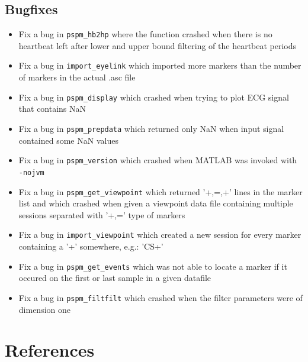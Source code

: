 \documentclass[english]{article}
\numberwithin{equation}{section}
\numberwithin{figure}{section}
\begin{document}
\subsection*{Bugfixes}
\begin{itemize}
\item Fix a bug in \texttt{pspm\_hb2hp} where the function crashed when
there is no heartbeat left after lower and upper bound filtering of
the heartbeat periods
\item Fix a bug in \texttt{import\_eyelink} which imported more markers
than the number of markers in the actual .asc file
\item Fix a bug in \texttt{pspm\_display} which crashed when trying to plot
ECG signal that contains NaN
\item Fix a bug in \texttt{pspm\_prepdata} which returned only NaN when
input signal contained some NaN values
\item Fix a bug in \texttt{pspm\_version} which crashed when MATLAB was
invoked with \texttt{-nojvm}
\item Fix a bug in \texttt{pspm\_get\_viewpoint} which returned '+,=,+'
lines in the marker list and which crashed when given a viewpoint
data file containing multiple sessions separated with '+,=' type of
markers
\item Fix a bug in \texttt{import\_viewpoint} which created a new session
for every marker containing a '+' somewhere, e.g.: 'CS+'
\item Fix a bug in \texttt{pspm\_get\_events} which was not able to locate
a marker if it occured on the first or last sample in a given datafile
\item Fix a bug in \texttt{pspm\_filtfilt} which crashed when the filter
parameters were of dimension one
\end{itemize}


\section{References}



\end{document}
